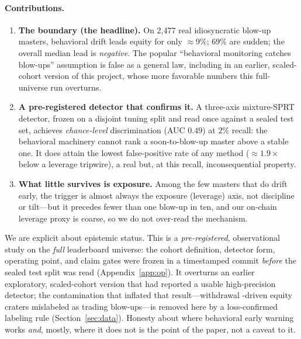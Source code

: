 \documentclass[11pt,a4paper]{article}
\begin{document}
\paragraph{Contributions.}
\begin{enumerate}[leftmargin=1.4em,itemsep=2pt]
  \item \textbf{The boundary (the headline).} On 2{,}477 real idiosyncratic
        blow-up masters, behavioral drift leads equity for only $\approx$9\%; 69\%
        are sudden; the overall median lead is \emph{negative}. The popular
        ``behavioral monitoring catches blow-ups'' assumption is false as a general
        law, including in an earlier, scaled-cohort version of this project, whose
        more favorable numbers this full-universe run overturns.
  \item \textbf{A pre-registered detector that confirms it.} A three-axis
        mixture-SPRT detector, frozen on a disjoint tuning split and read once
        against a sealed test set, achieves \emph{chance-level} discrimination
        (AUC $0.49$) at $2\%$ recall: the behavioral machinery cannot rank a
        soon-to-blow-up master above a stable one. It does attain the lowest
        false-positive rate of any method ($\approx 1.9\times$ below a leverage
        tripwire), a real but, at this recall, inconsequential property.
  \item \textbf{What little survives is exposure.} Among the few masters that do
        drift early, the trigger is almost always the exposure (leverage) axis, not
        discipline or tilt---but it precedes fewer than one blow-up in ten, and our
        on-chain leverage proxy is coarse, so we do not over-read the mechanism.
\end{enumerate}

We are explicit about epistemic status. This is a \emph{pre-registered},
observational study on the \emph{full} leaderboard universe: the cohort definition,
detector form, operating point, and claim gates were frozen in a timestamped commit
\emph{before} the sealed test split was read (Appendix~\ref{app:op}). It overturns
an earlier exploratory, scaled-cohort version that had reported a usable
high-precision detector; the contamination that inflated that result---withdrawal
-driven equity craters mislabeled as trading blow-ups---is removed here by a
loss-confirmed labeling rule (Section~\ref{sec:data}). Honesty about where
behavioral early warning works \emph{and}, mostly, where it does not is the point of
the paper, not a caveat to it.
\end{document}
